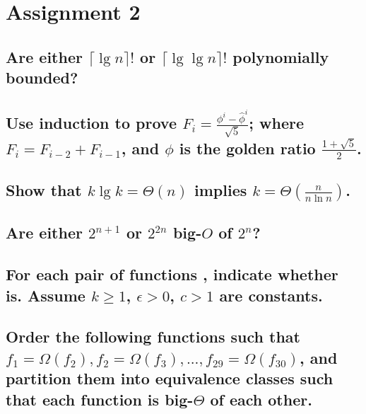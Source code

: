 \chapter{Assignment 2}

\section[Problem 1]{Are either $\lceil \lg n \rceil!$ or $\lceil \lg \lg n \rceil!$ polynomially bounded?}
\section[Problem 2]{Use induction to prove $F_i = \frac{\phi^i - \hat{\phi}^i}{\sqrt{5}}$; where $F_i = F_{i-2} + F_{i-1}$, and $\phi$ is the golden ratio $\frac{1 + \sqrt{5}}{2}$.}
\section[Problem 3]{Show that $k \lg k = \Theta(n)$ implies $k = \Theta\left(\frac{n}{n \ln n}\right)$.}
\section[Problem 4]{Are either $2^{n + 1}$ or $2^{2n}$ big-$O$ of $2^n$?}
\section[Problem 5]{For each pair of functions $ $, indicate whether $ $ is. Assume $k \geq 1$, $\epsilon > 0$, $c > 1$ are constants.}
\section[Problem 6]{Order the following functions such that $f_1 = \Omega(f_2), f_2 = \Omega(f_3), ..., f_{29} = \Omega(f_{30})$, and partition them into equivalence classes such that each function is big-$\Theta$ of each other.}
